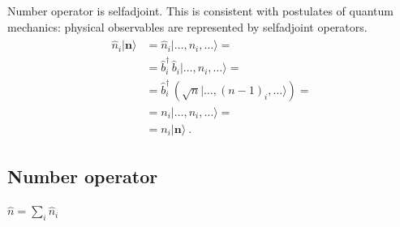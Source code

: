 \documentclass[letterpaper,10pt,english]{jupyterBook}
\begin{document}
\sphinxAtStartPar
{} Number operator is self\sphinxhyphen{}adjoint. This is consistent with postulates of quantum mechanics: physical observables are represented by self\sphinxhyphen{}adjoint operators.
\begin{equation*}
\begin{split}\begin{aligned}
  \hat{n}_i | \mathbf{n} \rangle
  & = \hat{n}_i | \dots, n_i, \dots \rangle = \\
  & = \hat{b}_i^\dagger \, \hat{b}_i | \dots, n_i, \dots \rangle = \\
  & = \hat{b}_i^\dagger \, \left( \sqrt{n} | \dots, (n-1)_i, \dots \rangle \right) = \\
  & = n_i | \dots, n_i, \dots \rangle = \\
  & = n_i | \mathbf{n} \rangle \ .
\end{aligned}\end{split}
\end{equation*}



\subsection{Number operator}
\label{\detokenize{ch/quantum-mechanics/many-body/bosons:number-operator}}\label{\detokenize{ch/quantum-mechanics/many-body/bosons:quantum-mechanics-second-quantizazion-bosons-number}}
\sphinxAtStartPar
{} \(\hat{n} = \sum_{i} \hat{n}_i\)
\end{document}
